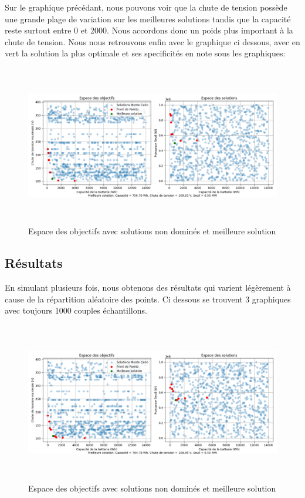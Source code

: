 \documentclass[11pt, a4paper, oneside, portrait]{report}
\begin{document}
            Sur le graphique précédant, nous pouvons voir que la chute de tension possède une grande plage de variation sur les meilleures solutions tandis que la capacité reste surtout entre 0 et 2000. Nous accordons donc un poids plus important à la chute de tension.
            Nous nous retrouvons enfin avec le graphique ci dessous, avec en vert la solution la plus optimale et ses specificités en note sous les graphiques:   

            \begin{figure}[H]
                \centering
                \includegraphics[height=7cm]{Monte-Carlo_meilleur_solution.png}
                \caption{Espace des objectifs avec solutions non dominés et meilleure solution}
            \end{figure}

        \subsection*{Résultats}
            En simulant plusieurs fois, nous obtenons des résultats qui varient légèrement à cause de la répartition aléatoire des points. Ci dessous se trouvent 3 graphiques avec toujours 1000 couples échantillons. 

            \begin{figure}[H]
                \centering
                \includegraphics[height=7cm]{Monte-Carlo.png}
                \caption{Espace des objectifs avec solutions non dominés et meilleure solution}
            \end{figure}
\end{document}
